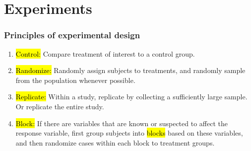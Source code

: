 
\section{Experiments}


\begin{frame}
\frametitle{Principles of experimental design}

\begin{enumerate}

\item \hl{Control:} Compare treatment of interest to a control group.

\item \hl{Randomize:} Randomly assign subjects to treatments, and randomly sample from the population whenever possible.

\item \hl{Replicate:} Within a study, replicate by collecting a sufficiently large sample. Or replicate the entire study.

\item \hl{Block:} If there are variables that are known or suspected to affect the response variable, first group subjects into \hl{blocks} based on these variables, and then randomize cases within each block to treatment groups.

\end{enumerate}

\end{frame}







